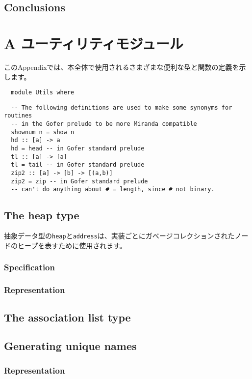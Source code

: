 \documentclass{jarticle}
\begin{document}
\subsection{Conclusions}
\newpage

\section{A ユーティリティモジュール}

このAppendixでは、本全体で使用されるさまざまな便利な型と関数の定義を示します。

\begin{verbatim}
  module Utils where
\end{verbatim}

\begin{verbatim}
  -- The following definitions are used to make some synonyms for routines
  -- in the Gofer prelude to be more Miranda compatible
  shownum n = show n
  hd :: [a] -> a
  hd = head -- in Gofer standard prelude
  tl :: [a] -> [a]
  tl = tail -- in Gofer standard prelude
  zip2 :: [a] -> [b] -> [(a,b)]
  zip2 = zip -- in Gofer standard prelude
  -- can't do anything about # = length, since # not binary.
\end{verbatim}

\subsection{The heap type}

抽象データ型の\texttt{heap}と\texttt{address}は、実装ごとにガベージコレクションされたノードのヒープを表すために使用されます。

\subsubsection{Specification}
\subsubsection{Representation}
\newpage

\subsection{The association list type}

\subsection{Generating unique names}
\subsubsection{Representation}
\newpage
\end{document}
